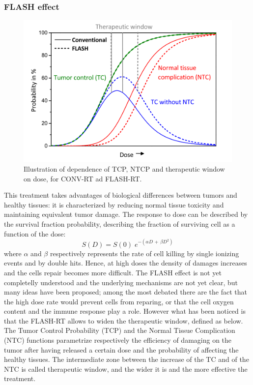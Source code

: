         \subsubsection{FLASH effect}
            \begin{figure}
                \centering
                \includegraphics[width=.7\linewidth]{figures/pixel_detectors_usage/curve_flash.png}
                \caption{Illustration of dependence of TCP, NTCP and therapeutic window on dose, for CONV-RT ad FLASH-RT.}
                \label{fig:therapeutic_window}
            \end{figure}
            This treatment takes advantages of biological differences between tumors and healthy tissues: it is characterized by reducing normal tissue toxicity and maintaining equivalent tumor damage. 
            The response to dose can be described by the survival fraction probability, describing the fraction of surviving cell as a function of the dose: 
            \begin{equation}
                S(D) = S(0)\;e^{-( \alpha D \, + \, \beta D^2)}
                \label{eq:survival_curve}
            \end{equation}
            where $\alpha$ and $\beta$ respectively represents the rate of cell killing by single ionizing events and by double hits. 
            Hence, at high doses the density of damages increases and the cells repair becomes more difficult. 
            The FLASH effect is not yet completelly understood and the underlying mechanisms are not yet clear, but many ideas have been proposed; among the most debated there are the fact that the high dose rate would prevent cells from reparing, or that the cell oxygen content and the immune response play a role.
            However what has been noticed is that the FLASH-RT allows to widen the therapeutic window, defined as below. 
            The Tumor Control Probability (TCP) and the Normal Tissue Complication (NTC) functions parametrize respectively the efficiency of damaging on the tumor after having released a certain dose and the probability of affecting the healthy tissues. The intermediate zone between the increase of the TC and of the NTC is called therapeutic window, and the wider it is and the more effective the treatment. 


